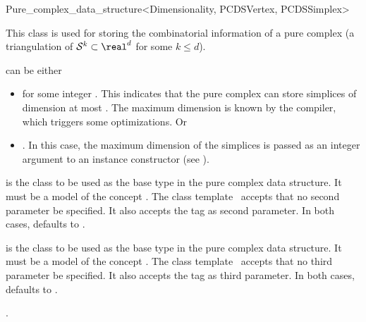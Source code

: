 \begin{ccRefClass}{Pure_complex_data_structure<Dimensionality, PCDSVertex, PCDSSimplex>}

\ccDefinition 
This class is used for storing the combinatorial information of a pure
complex (a triangulation of $\sphere^k\subset\real^d$ for some $k\le d$).


\ccParameters

 can be either \begin{itemize}

\item \ccPureGlobalScope{} for some integer . This
indicates that the pure complex can store simplices of dimension at most
. The maximum dimension  is known by the compiler, which
triggers some optimizations. Or

\item \ccPureGlobalScope{}. In this case, the maximum
dimension of the simplices is passed as an integer argument to an instance
constructor (see ).\end{itemize}

 is the class to be used as the base  type in the
pure complex data structure. It must be a model of the concept
. The class template \ccRefName\ accepts that no
second parameter be specified. It also accepts the tag  as
second parameter. In both cases,  defaults to
.


 is the class to be used as the base  type in
the pure complex data structure. It must be a model of the concept
. The class template \ccRefName\ accepts that no
third parameter be specified. It also accepts the tag  as
third parameter. In both cases,  defaults to
.

\ccIsModel

.

\end{ccRefClass}
